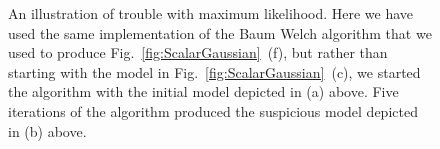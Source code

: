 \begin{figure}[htbp]
  \caption[An illustration of trouble with maximum likelihood.]%
  {An illustration of trouble with maximum likelihood.  Here we have
    used the same implementation of the Baum Welch algorithm that we
    used to produce Fig.~\ref{fig:ScalarGaussian}~(f), but rather than
    starting with the model in Fig.~\ref{fig:ScalarGaussian}~(c), we
    started the algorithm with the initial model depicted in (a)
    above.  Five iterations of the algorithm produced the suspicious
    model depicted in (b) above.}
  \label{fig:MLEfail}%
\end{figure}


